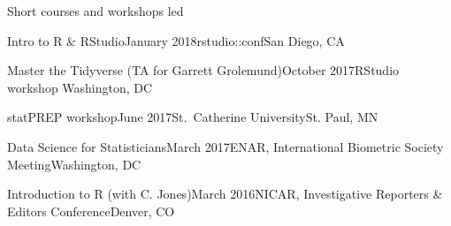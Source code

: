 \documentclass{resume} %
\begin{document}

\begin{rSection}{Short courses and workshops led}

\begin{sSubsection}{Intro to R \& RStudio}{}{January 2018}{rstudio::conf}{San Diego, CA}
\end{sSubsection}

\begin{sSubsection}{Master the Tidyverse}{ (TA for Garrett Grolemund)}{October 2017}{RStudio workshop }{Washington, DC}
\end{sSubsection}

\begin{sSubsection}{statPREP workshop}{}{June 2017}{St.~Catherine University}{St. Paul, MN}
\end{sSubsection}

\begin{sSubsection}{Data Science for Statisticians}{}{March 2017}{ENAR, International Biometric Society Meeting}{Washington, DC}
\end{sSubsection}

\begin{sSubsection}{Introduction to R }{(with C. Jones)}{March 2016}{NICAR, Investigative Reporters \& Editors Conference}{Denver, CO}
\end{sSubsection}



\end{rSection}

\end{document}
